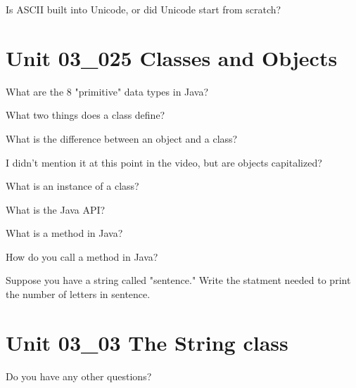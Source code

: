 \documentclass[letterpaper,12pt]{exam}
\newcommand{\unit}{Unit 03}
\begin{document}
\begin{questions}
\begin{samepage}
	\question Is ASCII built into Unicode, or did Unicode start from scratch?
	\vspace{5mm}
\end{samepage}
\section*{\unit\_025 Classes and Objects} %
\begin{samepage}
	\question What are the 8 "primitive" data types in Java?
	\vspace{5mm}
\end{samepage}
\begin{samepage}
	\question What two things does a class define?
	\vspace{5mm}
\end{samepage}
\begin{samepage}
	\question What is the difference between an object and a class?
	\vspace{5mm}
\end{samepage}
\begin{samepage}
	\question I didn't mention it at this point in the video, but are objects capitalized?
	\vspace{5mm}
\end{samepage}


\begin{samepage}
	\question What is an instance of a class?
	\vspace{5mm}
\end{samepage}

\begin{samepage}
	\question What is the Java API?
	\vspace{5mm}
\end{samepage}

\begin{samepage}
	\question What is a method in Java?
	\vspace{5mm}
\end{samepage}

\begin{samepage}
	\question How do you call a method in Java?
	\vspace{5mm}
\end{samepage}

\begin{samepage}
	\question Suppose you have a string called "sentence."  Write the statment needed to print the number of letters in sentence.
	\vspace{5mm}
\end{samepage}

\section*{\unit\_03 The String class} %



\begin{samepage}
	\question Do you have any other questions?
	\vspace{30mm}
\end{samepage}

\end{questions}
\end{document}
